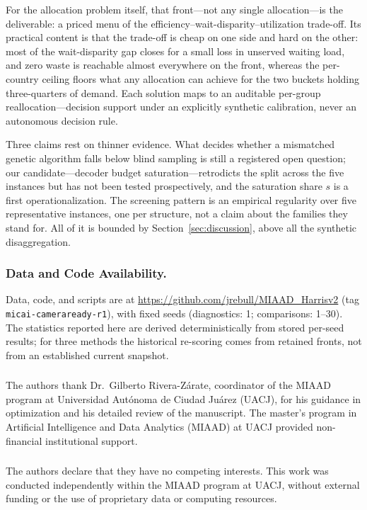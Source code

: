 \documentclass[runningheads]{llncs}
\newcommand{\repotag}{micai-cameraready-r1}
\begin{document}
For the allocation problem itself, that front---not any single allocation---is the deliverable: a priced menu of the efficiency--wait-disparity--utilization trade-off. Its practical content is that the trade-off is cheap on one side and hard on the other: most of the wait-disparity gap closes for a small loss in unserved waiting load, and zero waste is reachable almost everywhere on the front, whereas the per-country ceiling floors what any allocation can achieve for the two buckets holding three-quarters of demand. Each solution maps to an auditable per-group reallocation---decision support under an explicitly synthetic calibration, never an autonomous decision rule.

Three claims rest on thinner evidence. What decides whether a mismatched genetic algorithm falls below blind sampling is still a registered open question; our candidate---decoder budget saturation---retrodicts the split across the five instances but has not been tested prospectively, and the saturation share $s$ is a first operationalization. The screening pattern is an empirical regularity over five representative instances, one per structure, not a claim about the families they stand for. All of it is bounded by Section~\ref{sec:discussion}, above all the synthetic disaggregation.

\subsubsection*{Data and Code Availability.}
Data, code, and scripts are at \url{https://github.com/jrebull/MIAAD_Harrisv2} (tag \texttt{\repotag}), with fixed seeds (diagnostics: 1; comparisons: 1--30). The statistics reported here are derived deterministically from stored per-seed results; for three methods the historical re-scoring comes from retained fronts, not from an established current snapshot.

\begin{credits}
\subsubsection{\ackname}
The authors thank Dr.\ Gilberto Rivera-Z\'arate, coordinator of the MIAAD program at
Universidad Aut\'onoma de Ciudad Ju\'arez (UACJ), for his guidance in optimization and his
detailed review of the manuscript. The master's program in Artificial Intelligence and Data
Analytics (MIAAD) at UACJ provided non-financial institutional support.

\subsubsection{\discintname}
The authors declare that they have no competing interests. This work was conducted
independently within the MIAAD program at UACJ, without external funding or the use of
proprietary data or computing resources.
\end{credits}
\end{document}
